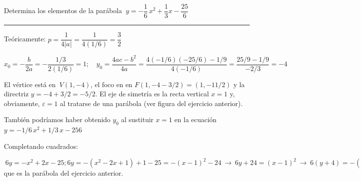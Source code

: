 \vspace{5mm}
\begin{miejercicio}

Determina los elementos de la parábola $\ y=-\dfrac 16\, x^2 +\dfrac 1 3 x -\dfrac {25}{6}$

\rule{250pt}{0.1pt}

\vspace{4mm} Teóricamente: $p=\dfrac 1{4|a|}=\dfrac{1}{4(1/6)}=\dfrac 3 2$

\vspace{2mm} $x_0=-\dfrac{b}{2a}=-\dfrac{1/3}{2 (1/6)}=1;\quad y_0=\dfrac{4ac-b^2}{4a}=\dfrac{4(-1/6)(-25/6)-1/9}{4(-1/6)}=\dfrac{25/9-1/9}{-2/3}=-4$

\vspace{2mm} El vértice está en $\ V(1,-4)$, el foco en en $F(1,-4-3/2)=(1,-11/2)$ y la directriz $y=-4+3/2=-5/2$.  El eje de simetría es la recta vertical $x=1$ y, obviamente, $\varepsilon=1$ al tratarse de una parábola \textcolor{gris}{(ver figura del ejercicio anterior)}.

\vspace{2mm}\begin{small} \textcolor{gris}{También podríamos haber obtenido $y_0$ al sustituir $x=1$ en la ecuación  $y=-1/6\, x^2 + 1/3\,  x -{25}{6}$}\end{small}

\vspace{6mm} Completando cuadrados:

\vspace{2mm} $\ 6y=-x^2+2x-25 ; 6y= -(x^2-2x+1)+1-25=-(x-1)^2-24 \ \to \ 6y+24=(x-1)^2 \ \to \ 6(y+4)=-(x^2-1) \ \Rightarrow \ (x-1)^2=-6(y+4) \ $ que es la parábola del ejercicio anterior.
	
\end{miejercicio}


\vspace{5mm}

